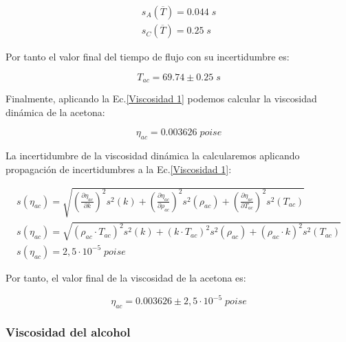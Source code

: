 \documentclass[a4paper,12pt,titlepage]{article}
\begin{document}
\begin{equation}
    \begin{gathered}
        s_A(\overline{T}) = 0.044 \; s \\
        s_C(\overline{T}) = 0.25 \; s
    \end{gathered}
\end{equation}

Por tanto el valor final del tiempo de flujo con su incertidumbre es:

\begin{equation}
    T_{ac} = 69.74 \pm 0.25 \; s
\end{equation}

Finalmente, aplicando la Ec.\ref{Viscosidad 1} podemos calcular la viscosidad dinámica de la acetona:

\begin{equation}
    \eta_{ac} = 0.003626 \; poise
\end{equation}

La incertidumbre de la viscosidad dinámica la calcularemos aplicando propagación de incertidumbres a la Ec.\ref{Viscosidad 1}:

\begin{equation}
    \begin{gathered}
    s\left(\eta_{ac}\right) =\sqrt{\left(\frac{\partial \eta_{ac}}{\partial k}\right)^2 s^2(k)+\left(\frac{\partial \eta_{a c}}{\partial \rho_{a c}}\right)^2 s^2\left(\rho_{ac}\right)+\left(\frac{\partial \eta_{ac}}{\partial T_{ac}}\right)^2 s^2\left(T_{a c}\right)} \\
    s\left(\eta_{a c}\right)  =\sqrt{\left(\rho_{a c} \cdot T_{a c}\right)^2 s^2(k)+\left(k \cdot T_{a c}\right)^2 s^2\left(\rho_{a c}\right)+\left(\rho_{a c} \cdot k\right)^2 s^2\left(T_{a c}\right)} \\
    s(\eta_{ac}) = 2,5 \cdot 10^{-5} \; poise
    \end{gathered}
    \label{Inc visc}
\end{equation}

Por tanto, el valor final de la viscosidad de la acetona es:

\begin{equation}
    \eta_{ac} = 0.003626 \pm 2,5 \cdot 10^{-5} \; poise
\end{equation}


\subsubsection{Viscosidad del alcohol}
\end{document}
